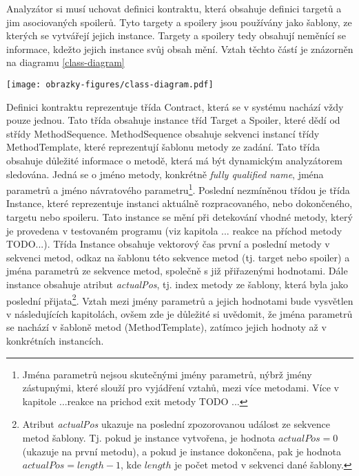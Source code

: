 Analyzátor si musí uchovat definici kontraktu, která obsahuje definici targetů a jim asociovaných spoilerů. Tyto targety a spoilery jsou používány jako šablony, ze kterých se vytvářejí jejich instance. Targety a spoilery tedy obsahují neměnící se informace, kdežto jejich instance svůj obsah mění. Vztah těchto částí je znázorněn na diagramu \ref{class-diagram}

\begin{sidewaysfigure}[!htbp]
    \texttt{[image: obrazky-figures/class-diagram.pdf]}
    \caption{Diagram zobrazující třídy Target, Spoiler, Instance a jim přidružené.}
    \label{class-diagram}
\end{sidewaysfigure}

Definici kontraktu reprezentuje třída Contract, která se v systému nachází vždy pouze jednou. Tato třída obsahuje instance tříd Target a Spoiler, které dědí od střídy MethodSequence. MethodSequence obsahuje sekvenci instancí třídy MethodTemplate, které reprezentují šablonu metody ze zadání. Tato třída obsahuje důležité informace o metodě, která má být dynamickým analyzátorem sledována. Jedná se o jméno metody, konkrétně \textit{fully qualified name}, jména parametrů a jméno návratového parametru\footnote{Jména parametrů nejsou skutečnými jmény parametrů, nýbrž jmény zástupnými, které slouží pro vyjádření vztahů, mezi více metodami. Více v kapitole ...reakce na prichod exit metody TODO ...}. Poslední nezmíněnou třídou je třída Instance, které reprezentuje instanci aktuálně rozpracovaného, nebo dokončeného, targetu nebo spoileru. Tato instance se mění při detekování vhodné metody, který je provedena v testovaném programu (viz kapitola ... reakce na příchod metody TODO...). Třída Instance obsahuje vektorový čas první a poslední metody v sekvenci metod, odkaz na šablonu této sekvence metod (tj. target nebo spoiler) a jména parametrů ze sekvence metod, společně s již přiřazenými hodnotami. Dále instance obsahuje atribut \textit{actualPos}, tj. index metody ze šablony, která byla jako poslední přijata\footnote{Atribut \textit{actualPos} ukazuje na poslední zpozorovanou událost ze sekvence metod šablony. Tj. pokud je instance vytvořena, je hodnota $actualPos = 0$ (ukazuje na první metodu), a pokud je instance dokončena, pak je hodnota $actualPos = length-1$, kde $length$ je počet metod v sekvenci dané šablony.}. Vztah mezi jmény parametrů a jejich hodnotami bude vysvětlen v následujících kapitolách, ovšem zde je důležité si uvědomit, že jména parametrů se nachází v šabloně metod (MethodTemplate), zatímco jejich hodnoty až v konkrétních instancích.

